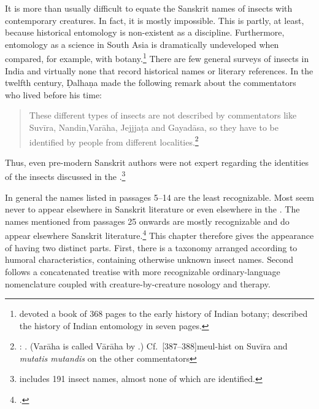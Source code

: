 It is more than usually difficult to equate the Sanskrit names of
insects with contemporary creatures.  In fact, it is mostly
impossible. This is partly, at least, because historical entomology is
non-existent as a discipline. Furthermore, entomology as a science in
South Asia is dramatically undeveloped when compared, for example,
with botany.\footnote{\citet{desm-1992} devoted a book of 368 pages to
    the early history of Indian botany; \citet[338--345]{dove-1922}
    described the history of Indian entomology in seven pages.}  There are
few general surveys of insects in India and virtually none that record
historical names or literary references.  In the twelfth century,
Ḍalhaṇa made the following remark about the commentators who lived
before his time:
\begin{quote}
These different types of insects are not described by commentators
like Suvīra, Nandin,Varāha, Jejjjaṭa and Gayadāsa, so they have to be
identified by people from different
localities.\footnote{: .
    (Varāha is called Vārāha by .) Cf.\
    [387--388]{meul-hist} on Suvīra and \emph{mutatis
mutandis} on
    the other commentators}
\end{quote}
Thus, even pre-modern Sanskrit authors were not expert regarding the
identities of the insects discussed in the
\SS.\footnote{\cite{moni-sans} includes 191 insect names, almost none
    of which are identified.}  
    
In general the names listed in passages 5--14 are the  least
recognizable.  Most seem never to appear elsewhere in Sanskrit
literature or even elsewhere in the \SS.  The names mentioned from
passages 25 onwards are mostly recognizable and do appear elsewhere
Sanskrit literature.\footcite[E.g.,][]{mitr-2005} This chapter
therefore gives the appearance of having two distinct parts.  First,
there is a taxonomy arranged according to humoral characteristics,
containing otherwise unknown insect names. Second follows a
concatenated treatise with more recognizable ordinary-language
nomenclature coupled with creature-by-creature nosology and therapy.

